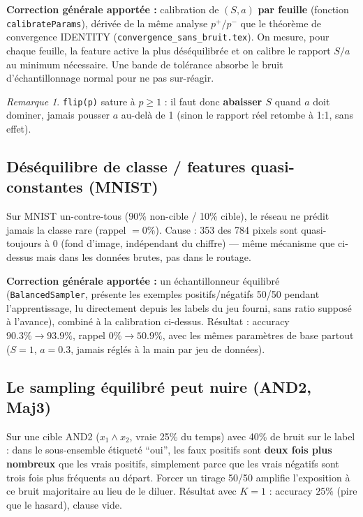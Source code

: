\documentclass[12pt,a4paper]{article}
\theoremstyle{remark}
\newtheorem{remark}{Remarque}[section]
\begin{document}
\textbf{Correction générale apportée :} calibration de $(S,a)$ \textbf{par
feuille} (fonction \texttt{calibrateParams}), dérivée de la même analyse
$p^+/p^-$ que le théorème de convergence IDENTITY
(\texttt{convergence\_sans\_bruit.tex}). On mesure, pour chaque feuille, la
feature active la plus déséquilibrée et on calibre le rapport $S/a$ au
minimum nécessaire. Une bande de tolérance absorbe le bruit
d'échantillonnage normal pour ne pas sur-réagir.

\begin{remark}
\texttt{flip(p)} sature à $p \geq 1$ : il faut donc \textbf{abaisser $S$}
quand $a$ doit dominer, jamais pousser $a$ au-delà de 1 (sinon le rapport
réel retombe à 1:1, sans effet).
\end{remark}

\subsection{Déséquilibre de classe / features quasi-constantes (MNIST)}

Sur MNIST un-contre-tous (90\% non-cible / 10\% cible), le réseau ne prédit
jamais la classe rare (rappel $=0\%$). Cause : 353 des 784 pixels sont
quasi-toujours à 0 (fond d'image, indépendant du chiffre) --- même mécanisme
que ci-dessus mais dans les données brutes, pas dans le routage.

\textbf{Correction générale apportée :} un échantillonneur équilibré
(\texttt{BalancedSampler}, présente les exemples positifs/négatifs 50/50
pendant l'apprentissage, lu directement depuis les labels du jeu fourni,
sans ratio supposé à l'avance), combiné à la calibration ci-dessus.
Résultat : accuracy $90.3\% \to 93.9\%$, rappel $0\% \to 50.9\%$, avec les
mêmes paramètres de base partout ($S=1$, $a=0.3$, jamais réglés à la main
par jeu de données).

\subsection{Le sampling équilibré peut nuire (AND2, Maj3)}

Sur une cible AND2 ($x_1 \wedge x_2$, vraie 25\% du temps) avec 40\% de
bruit sur le label : dans le sous-ensemble étiqueté ``oui'', les faux
positifs sont \textbf{deux fois plus nombreux} que les vrais positifs,
simplement parce que les vrais négatifs sont trois fois plus fréquents au
départ. Forcer un tirage 50/50 amplifie l'exposition à ce bruit majoritaire
au lieu de le diluer. Résultat avec $K=1$ : accuracy $25\%$ (pire que le
hasard), clause vide.
\end{document}
